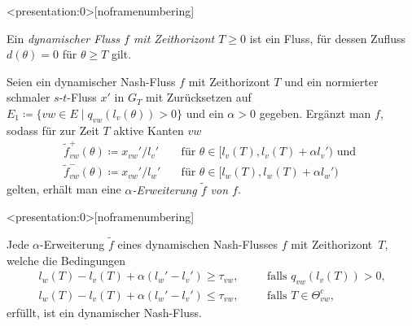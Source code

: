 \begin{frame}<presentation:0>[noframenumbering]
	\begin{definition}
		Ein \emph{dynamischer Fluss $f$ mit Zeithorizont $T\geq0$} ist ein Fluss, für dessen Zufluss $d(\theta)= 0$ für $\theta\geq T$ gilt.
	\end{definition}

	\pause\begin{definition}
		Seien ein dynamischer Nash-Fluss $f$ mit Zeithorizont $T$ und ein normierter schmaler $s$-$t$-Fluss $x'$ in $G_T$ mit Zurücksetzen auf $E_1 \coloneq \{ vw\in E \mid q_{vw}(l_v(\theta)) > 0 \}$ und ein $\alpha > 0$ gegeben.
		Ergänzt man $f$, sodass für zur Zeit $T$ aktive Kanten $vw$
		\begin{align*}
			\tilde{f}_{vw}^+(\theta)\coloneq x_{vw}'/l_v'& \text{~~~für $\theta\in [l_v(T), l_v(T)+\alpha l_v')$ und } \\
			\tilde{f}_{vw}^-(\theta)\coloneq x_{vw}'/l_w'& \text{~~~für $\theta\in [l_w(T), l_w(T)+\alpha l_w')$}
		\end{align*}
		gelten, erhält man eine \emph{$\alpha$-Erweiterung $\tilde{f}$ von $f$}.
	\end{definition}
\end{frame}

\begin{frame}<presentation:0>[noframenumbering]
	\begin{theorem}
		Jede $\alpha$-Erweiterung $\tilde{f}$ eines dynamischen Nash-Flusses $f$ mit Zeithorizont~$T$, welche die Bedingungen
		\begin{align*}
			l_w(T) - l_v(T) + \alpha(l_w' - l_v') \geq \tau_{vw}, &\text{ ~~~~falls $q_{vw}(l_v(T)) > 0$,}\\
			l_w(T) - l_v(T) + \alpha(l_w' - l_v') \leq \tau_{vw}, &\text{ ~~~~falls $T\in\Theta_{vw}^c $,}
		\end{align*}
		erfüllt, ist ein dynamischer Nash-Fluss.
	\end{theorem}
\end{frame}

